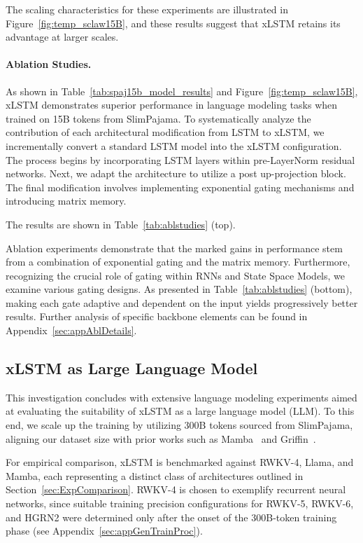 The scaling characteristics for these experiments are illustrated in Figure~\ref{fig:temp_sclaw15B}, and these results suggest that xLSTM retains its advantage at larger scales.

\paragraph{Ablation Studies.}
As shown in Table~\ref{tab:spaj15b_model_results} and Figure~\ref{fig:temp_sclaw15B}, xLSTM demonstrates superior performance in language modeling tasks when trained on 15B tokens from SlimPajama. To systematically analyze the contribution of each architectural modification from LSTM to xLSTM, we incrementally convert a standard LSTM model into the xLSTM configuration. The process begins by incorporating LSTM layers within pre-LayerNorm residual networks. Next, we adapt the architecture to utilize a post up-projection block. The final modification involves implementing exponential gating mechanisms and introducing matrix memory.

The results are shown in Table~\ref{tab:ablstudies} (top). 

Ablation experiments demonstrate that the marked gains in performance stem from a combination of exponential gating and the matrix memory. Furthermore, recognizing the crucial role of gating within RNNs and State Space Models, we examine various gating designs. As presented in Table~\ref{tab:ablstudies} (bottom), making each gate adaptive and dependent on the input yields progressively better results. Further analysis of specific backbone elements can be found in Appendix~\ref{sec:appAblDetails}.

\subsection{xLSTM as Large Language Model}
\label{sec:ExpLanguage}

This investigation concludes with extensive language modeling experiments aimed at evaluating the suitability of xLSTM as a large language model (LLM). To this end, we scale up the training by utilizing 300B tokens sourced from SlimPajama, aligning our dataset size with prior works such as Mamba~\citep{Gu:24arxiv} and Griffin~\citep{De:24arxiv}.

For empirical comparison, xLSTM is benchmarked against RWKV-4, Llama, and Mamba, each representing a distinct class of architectures outlined in Section~\ref{sec:ExpComparison}. RWKV-4 is chosen to exemplify recurrent neural networks, since suitable training precision configurations for RWKV-5, RWKV-6, and HGRN2 were determined only after the onset of the 300B-token training phase (see Appendix~\ref{sec:appGenTrainProc}). 

